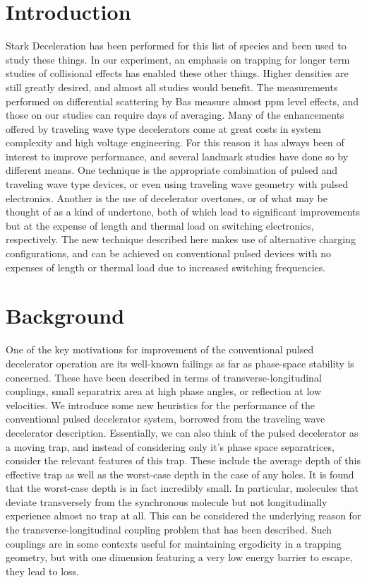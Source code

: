\documentclass[%
 reprint,
 amsmath,amssymb,
 aps,
pra,
]{revtex4-1}
\begin{document}
\section{Introduction}
Stark Deceleration has been performed for this list of species and been used to study these things. In our experiment, an emphasis on trapping for longer term studies of collisional effects has enabled these other things. Higher densities are still greatly desired, and almost all studies would benefit. The measurements performed on differential scattering by Bas measure almost ppm level effects, and those on our studies can require days of averaging. Many of the enhancements offered by traveling wave type decelerators come at great costs in system complexity and high voltage engineering. For this reason it has always been of interest to improve performance, and several landmark studies have done so by different means. One technique is the appropriate combination of pulsed and traveling wave type devices, or even using traveling wave geometry with pulsed electronics. Another is the use of decelerator overtones, or of what may be thought of as a kind of undertone, both of which lead to significant improvements but at the expense of length and thermal load on switching electronics, respectively. The new technique described here makes use of alternative charging configurations, and can be achieved on conventional pulsed devices with no expenses of length or thermal load due to increased switching frequencies.

\section{Background}
One of the key motivations for improvement of the conventional pulsed decelerator operation are its well-known failings as far as phase-space stability is concerned. These have been described in terms of transverse-longitudinal couplings, small separatrix area at high phase angles, or reflection at low velocities. We introduce some new heuristics for the performance of the conventional pulsed decelerator system, borrowed from the traveling wave decelerator description. Essentially, we can also think of the pulsed decelerator as a moving trap, and instead of considering only it's phase space separatrices, consider the relevant features of this trap. These include the average depth of this effective trap as well as the worst-case depth in the case of any holes. It is found that the worst-case depth is in fact incredibly small. In particular, molecules that deviate transversely from the synchronous molecule but not longitudinally experience almost no trap at all. This can be considered the underlying reason for the transverse-longitudinal coupling problem that has been described. Such couplings are in some contexts useful for maintaining ergodicity in a trapping geometry, but with one dimension featuring a very low energy barrier to escape, they lead to loss.
\end{document}
